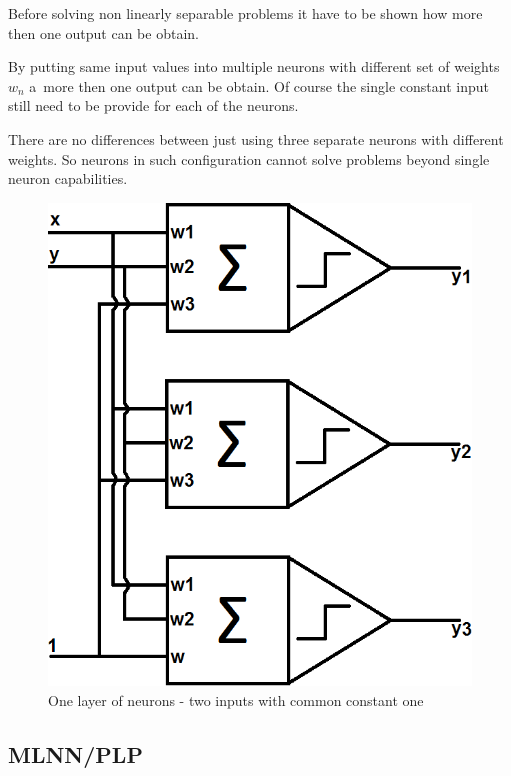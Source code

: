 Before solving non linearly separable problems it have to be shown how more then one output can be obtain.

By putting same input values into multiple neurons with different set of weights $w_n$ a~more then one output can be obtain. Of course the single constant input still need to be provide for each of the neurons.

There are no differences between just using three separate neurons with different weights. So neurons in such configuration cannot solve problems beyond single neuron capabilities.

\begin{figure}[!h]
    \centering
    \includegraphics[scale=0.27]{Media/Layer.png}
    \caption[One layer of neurons]{One layer of neurons - two inputs with common constant one}
    \label{fig:OneNeuronsLayer}
\end{figure}

\newpage

\subsection{MLNN/PLP}

